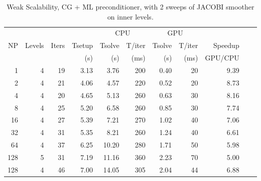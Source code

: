 \begin{table}[h!]
\centering
\begin{tabular}{rrrrrrrrrrr}
    &        &       &        & \multicolumn{2}{c}{CPU} &\multicolumn{2}{c}{GPU} & \\
NP  & Levels & Iters & Tsetup & Tsolve & T/iter & Tsolve & T/iter  & Speedup\\
    &        &       & (s)    & (s)    & (ms)   & (s)    & (ms)    & GPU/CPU \\
\hline
1   & 4       & 19  & 3.13  & 3.76  & 200 & 0.40 & 20   & 9.39  \\
2   & 4       & 21  & 4.06  & 4.57  & 220 & 0.52 & 20   & 8.73  \\
4   & 4       & 20  & 4.65  & 5.13  & 260 & 0.63 & 30   & 8.16  \\
8   & 4       & 25  & 5.20  & 6.58  & 260 & 0.85 & 30   & 7.74  \\
16  & 4       & 27  & 5.39  & 7.21  & 270 & 1.02 & 40   & 7.06  \\
32  & 4       & 31  & 5.35  & 8.21  & 260 & 1.24 & 40   & 6.61  \\
64  & 4       & 37  & 6.25  & 10.20 & 280 & 1.71 & 50   & 5.98  \\ 
128 & 5       & 31  & 7.19  & 11.16 & 360 & 2.23 & 70   & 5.00  \\
\hline
128 & 4       & 46  & 7.00  & 14.05 & 305 & 2.04 & 44   & 6.88  \\
\hline
\end{tabular}
\caption{Weak Scalability,  CG + ML preconditioner,  with 2 sweeps of JACOBI smoother on inner levels.\label{gpu-jac}}
\end{table}
\fi

